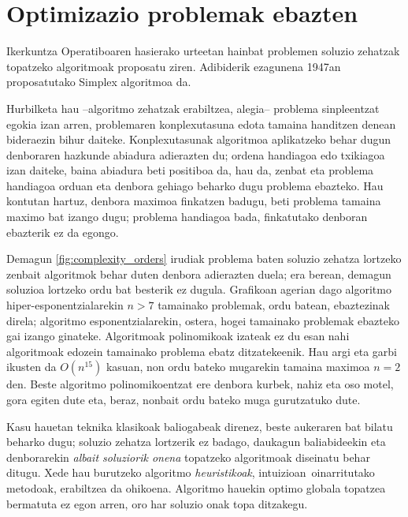 \documentclass[eu]{ifirak}\usepackage[]{graphicx}\usepackage[]{color}
\newcommand{\zkk}{\guillemotleft}
\newcommand{\skk}{\guillemotright}
\begin{document}
\section{Optimizazio problemak ebazten}

Ikerkuntza Operatiboaren hasierako urteetan hainbat problemen soluzio zehatzak topatzeko algoritmoak proposatu ziren. Adibiderik ezagunena 1947an proposatutako Simplex algoritmoa da. 

Hurbilketa hau --algoritmo zehatzak erabiltzea, alegia-- problema sinpleentzat egokia izan arren, problemaren konplexutasuna edota tamaina handitzen denean bideraezin bihur daiteke. Konplexutasunak algoritmoa aplikatzeko behar dugun denboraren hazkunde abiadura adierazten du; ordena handiagoa edo txikiagoa izan daiteke, baina abiadura beti positiboa da, hau da, zenbat eta problema handiagoa orduan eta denbora gehiago beharko dugu problema ebazteko. Hau kontutan hartuz, denbora maximoa finkatzen badugu, beti problema tamaina maximo bat izango dugu; problema handiagoa bada, finkatutako denboran ebazterik ez da egongo.

Demagun \ref{fig:complexity_orders} irudiak problema baten soluzio zehatza lortzeko zenbait algoritmok behar duten denbora adierazten duela; era berean, demagun soluzioa lortzeko ordu bat besterik ez dugula. Grafikoan agerian dago algoritmo hiper-esponentzialarekin $n>7$ tamainako problemak, ordu batean, ebaztezinak direla; algoritmo esponentzialarekin, ostera, hogei tamainako problemak ebazteko gai izango ginateke. Algoritmoak polinomikoak izateak ez du esan nahi algoritmoak edozein tamainako problema ebatz ditzatekeenik. Hau argi eta garbi ikusten da $O(n^{15})$ kasuan, non ordu bateko mugarekin tamaina maximoa $n=2$ den. Beste algoritmo polinomikoentzat ere denbora kurbek, nahiz eta oso motel, gora egiten dute eta, beraz, nonbait ordu bateko muga gurutzatuko dute.

Kasu hauetan teknika klasikoak baliogabeak direnez, beste aukeraren bat bilatu beharko dugu; soluzio zehatza lortzerik ez badago, daukagun baliabideekin eta denborarekin \textit{albait soluziorik onena} topatzeko algoritmoak diseinatu behar ditugu. Xede hau burutzeko algoritmo \textit{heuristikoak}, \zkk intuizioan\skk\ oinarritutako metodoak, erabiltzea da ohikoena. Algoritmo hauekin optimo globala topatzea bermatuta ez egon arren, oro har soluzio onak topa ditzakegu.
\end{document}
